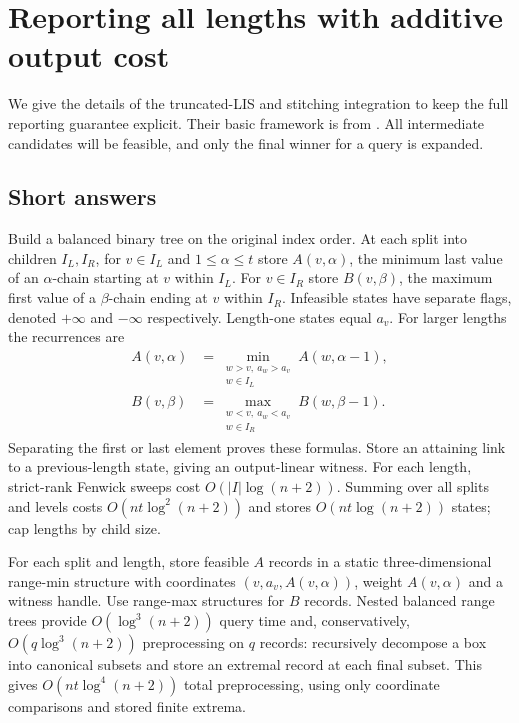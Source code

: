 \documentclass[acmsmall,11pt,nonacm,natbib=false]{acmart}
\begin{document}
\section{Reporting all lengths with additive output cost}
We give the details of the truncated-LIS and stitching integration to keep
the full reporting guarantee explicit. Their basic framework is from
\cite{KR26,KRfull}. All intermediate candidates will be feasible, and only
the final winner for a query is expanded.

\subsection{Short answers}
Build a balanced binary tree on the original index order. At each split
into children $I_L,I_R$, for $v\in I_L$ and $1\leq\alpha\leq t$ store
$A(v,\alpha)$, the minimum last value of an $\alpha$-chain starting at
$v$ within $I_L$. For $v\in I_R$ store $B(v,\beta)$, the maximum first
value of a $\beta$-chain ending at $v$ within $I_R$. Infeasible states
have separate flags, denoted $+\infty$ and $-\infty$ respectively.
Length-one states equal $a_v$. For larger lengths the recurrences are
\begin{align}
 A(v,\alpha)&=\min_{\substack{w>v,\ a_w>a_v\\w\in I_L}}
                    A(w,\alpha-1),\label{eq:shortA}\\
 B(v,\beta)&=\max_{\substack{w<v,\ a_w<a_v\\w\in I_R}}
                    B(w,\beta-1).\label{eq:shortB}
\end{align}
Separating the first or last element proves these formulas. Store an
attaining link to a previous-length state, giving an output-linear witness.
For each length, strict-rank Fenwick sweeps cost $O(|I|\log(n+2))$.
Summing over all splits and levels costs $O(nt\log^2(n+2))$ and stores
$O(nt\log(n+2))$ states; cap lengths by child size.

For each split and length, store feasible $A$ records in a static
three-dimensional range-min structure with coordinates
$(v,a_v,A(v,\alpha))$, weight $A(v,\alpha)$ and a witness handle.
Use range-max structures for $B$ records. Nested balanced range trees
provide $O(\log^3(n+2))$ query time and, conservatively,
$O(q\log^3(n+2))$ preprocessing on $q$ records: recursively decompose a
box into canonical subsets and store an extremal record at each final
subset. This gives $O(nt\log^4(n+2))$ total preprocessing, using only
coordinate comparisons and stored finite extrema.
\end{document}
